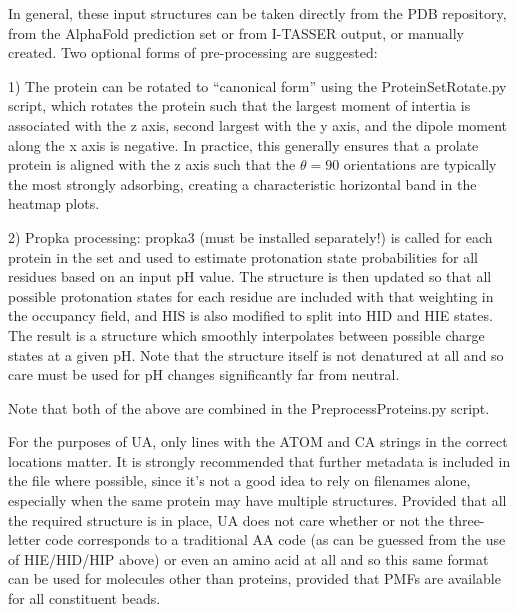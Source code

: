 \documentclass[10pt,a4paper,onecolumn]{report}
\begin{document}
In general, these input structures can be taken directly from the PDB repository, from the AlphaFold prediction set or from I-TASSER output, or manually created. Two optional forms of pre-processing are suggested:

1) The protein can be rotated to ``canonical form'' using the ProteinSetRotate.py script, which rotates the protein such that the largest moment of intertia is associated with the z axis, second largest with the y axis, and the dipole moment along the x axis is negative. In practice, this generally ensures that a prolate protein is aligned with the z axis such that the $\theta = 90$ orientations are typically the most strongly adsorbing, creating a characteristic horizontal band in the heatmap plots. 

2) Propka processing: propka3 (must be installed separately!) is called for each protein in the set and used to estimate protonation state probabilities for all residues based on an input pH value. The structure is then updated so that all possible protonation states for each residue are included with that weighting in the occupancy field, and HIS is also modified to split into HID and HIE states. The result is a structure which smoothly interpolates between possible charge states at a given pH. Note that the structure itself is not denatured at all and so care must be used for pH changes significantly far from neutral. 

Note that both of the above are combined in the PreprocessProteins.py script.

For the purposes of UA, only lines with the ATOM and CA strings in the correct locations matter. It is strongly recommended that further metadata is included in the file where possible, since it's not a good idea to rely on filenames alone, especially when the same protein may have multiple structures. Provided that all the required structure is in place, UA does not care whether or not the three-letter code corresponds to a traditional AA code (as can be guessed from the use of HIE/HID/HIP above) or even an amino acid at all and so this same format can be used for molecules other than proteins, provided that PMFs are available for all constituent beads. 
\end{document}
